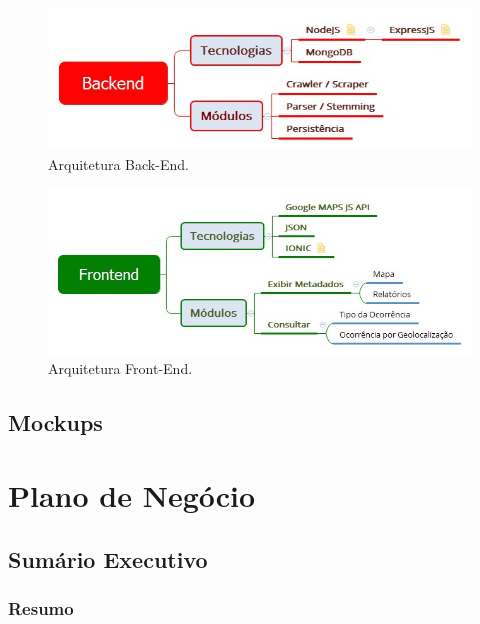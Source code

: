 \documentclass[
	12pt,				%
	openright,			%
	twoside,			%
	a4paper,			%
	english,			%
	french,				%
	spanish,			%
	brazil,				%
	]{abntex2}
\begin{document}
\begin{figure}[h]
	\caption{\label{backend_figura}Arquitetura Back-End.}
	\begin{center}
		\includegraphics[scale=0.6]{figuras/arquitetura-backend.jpeg}
	\end{center}
\end{figure}


\begin{figure}[h]
	\caption{\label{frontend_figura}Arquitetura Front-End.}
	\begin{center}
		\includegraphics[scale=0.6]{figuras/arquitetura-frontend.jpeg}
	\end{center}
\end{figure}

\chapter{Mockups}


\part{Plano de Negócio}

\chapter{Sumário Executivo}


\section{Resumo}
\end{document}
